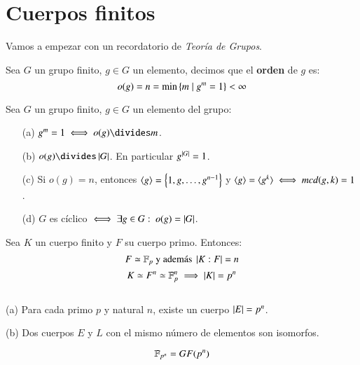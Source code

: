 \section{Cuerpos finitos}

Vamos a empezar con un recordatorio de \textit{Teoría de Grupos}.

\begin{dfn}
    Sea $G$ un grupo finito, $g \in G$ un elemento, decimos que el \textbf{orden} de $g$ es:
    $$
        o(g) = n = \min\left\{m \mid g^m = 1 \right\} < \infty
    $$
\end{dfn}

\begin{thm}\label{thm:3.5.1}
    Sea $G$ un grupo finito, $g \in G$ un elemento del grupo:
    \begin{itemize}
        \item[(a)] $g^m = 1 \iff o(g) \divides m$.
        \item[(b)] $o(g) \divides \vabs{G}$. En particular $g^{\left|G\right|} = 1$.
        \item[(c)] Si $o(g) = n$, entonces $\langle g\rangle = \left\{1, g, \ldots, g^{n-1}\right\}$ y $\langle g\rangle = \langle g^k\rangle \iff mcd(g, k)=1$.
        \item[(d)] $G$ es cíclico $\iff \exists g \in G:\ o(g) = \left|G\right|$.
    \end{itemize}
\end{thm}

\begin{obs}
    Sea $K$ un  cuerpo finito y $F$ su cuerpo primo. Entonces:
    $$
        F \simeq \mathbb{F}_p \text{ y además } \left|K:F\right| = n
    $$
    $$
        K \simeq F^n \simeq \mathbb{F}_p^n \implies \left|K\right| = p^n
    $$
\end{obs}

\begin{thm}\label{thm:3.5.2}$ $
    \item[(a)] Para cada primo $p$ y natural $n$, existe un cuerpo $\left|E\right| = p^n$.
    \item[(b)] Dos cuerpos $E$ y $L$ con el mismo número de elementos son isomorfos.
\end{thm}

\begin{obs}
    $$
        \mathbb{F}_{p^n} = GF(p^n)
    $$
\end{obs}

